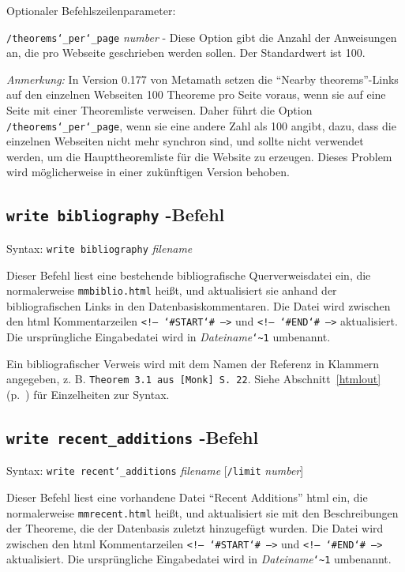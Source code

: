 Optionaler Befehlszeilenparameter:

    \texttt{/theorems{\char`\_}per{\char`\_}page} {\em number} - Diese Option gibt die Anzahl der Anweisungen an, die pro Webseite geschrieben werden sollen.  Der Standardwert ist 100.

{\em Anmerkung:} In Version 0.177 von Metamath setzen die "`Nearby theorems"'-Links auf den einzelnen Webseiten 100 Theoreme pro Seite voraus, wenn sie auf eine Seite mit einer Theoremliste verweisen.  Daher führt die Option \texttt{/theorems{\char`\_}per{\char`\_}page}, wenn sie eine andere Zahl als 100 angibt, dazu, dass die einzelnen Webseiten nicht mehr synchron sind, und sollte nicht verwendet werden, um die Haupttheoremliste für die Website zu erzeugen.  Dieses Problem wird möglicherweise in einer zukünftigen Version behoben. 


\subsection{\texttt{write bibliography}\label{wrbib}
-Befehl}

Syntax:  \texttt{write bibliography} {\em filename}

Dieser Befehl liest eine bestehende bibliografische Querverweisdatei ein, die normalerweise \texttt{mmbiblio.html} heißt, und aktualisiert sie anhand der bibliografischen Links in den Datenbasiskommentaren.  Die Datei wird zwischen den {\sc html} Kommentarzeilen \texttt{<!-- {\char`\#}START{\char`\#} -->} und \texttt{<!-- {\char`\#}END{\char`\#} -->} aktualisiert.  Die ursprüngliche Eingabedatei wird in {\em Dateiname}\texttt{{\char`\~}1} umbenannt. 

Ein bibliografischer Verweis wird mit dem Namen der Referenz in Klammern angegeben, z. B. \texttt{Theorem 3.1 aus [Monk] S.\ 22}. Siehe Abschnitt~\ref{htmlout} (p.~\pageref{htmlout}) für Einzelheiten zur Syntax. 


\subsection{\texttt{write recent\_additions}
-Befehl}

Syntax:  \texttt{write recent{\char`\_}additions} {\em filename}
[\texttt{/limit} {\em number}]

Dieser Befehl liest eine vorhandene Datei "`Recent Additions"' {\sc html} ein, die normalerweise \texttt{mmrecent.html} heißt, und aktualisiert sie mit den Beschreibungen der Theoreme, die der Datenbasis zuletzt hinzugefügt wurden.  Die Datei wird zwischen den {\sc html} Kommentarzeilen \texttt{<!-- {\char`\#}START{\char`\#} -->} und \texttt{<!-- {\char`\#}END{\char`\#} -->} aktualisiert.  Die ursprüngliche Eingabedatei wird in {\em Dateiname}\texttt{{\char`\~}1} umbenannt. 

